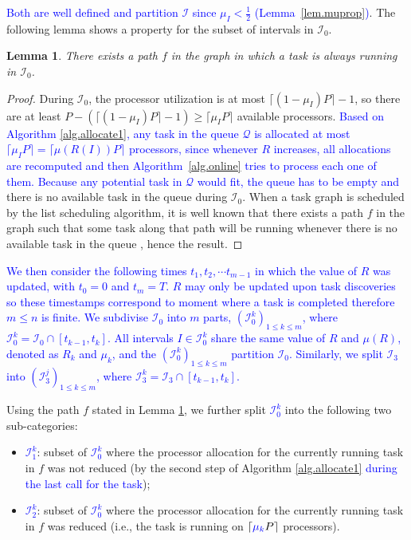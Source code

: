 \documentclass{article}
\newtheorem{lemma}{Lemma}
\newcommand\ratio{R\xspace}
\newcommand{\new}[1]{\textcolor{blue}{#1}}
\begin{document}
\new{Both are well defined and partition $\mathcal{I}$ since $\mu_I < \frac{1}{2}$ (Lemma~\ref{lem.muprop})}. The following lemma shows a property for the subset of intervals in $\mathcal{I}_0$.
\begin{lemma}\label{lem.I0_path}
There exists a path $f$ in the graph in which a task is always running in $\mathcal{I}_0$.
\end{lemma}

\begin{proof}
During $\mathcal{I}_0$, the processor utilization is at most $\lceil (1-\mu_I) P \rceil - 1$, so there are at least $P - (\lceil (1-\mu_I) P \rceil - 1) \ge \lceil \mu_I P \rceil$ available processors. \new{Based on Algorithm \ref{alg.allocate1}, any task in the queue $\mathcal{Q}$ is allocated at most $\lceil \mu_I P \rceil=\lceil \mu(\ratio(I)) P \rceil$ processors, since whenever $\ratio$ increases, all allocations are recomputed and then Algorithm~\ref{alg.online} tries to process each one of them. Because any potential task in $\mathcal{Q}$ would fit, the queue has to be empty and} there is no available task in the queue  during $\mathcal{I}_0$. When a task graph is scheduled by the list scheduling algorithm, it is well known that there exists a path $f$ in the graph such that some task along that path will be running whenever there is no available task in the queue \cite{Feldmann98_DAG, Lepere01_DAG, Jansen06_DAG}, hence the result.
\end{proof}

\new{We then consider the following times $t_1, t_2, \cdots t_{m-1}$ in which the value of $\ratio$ was updated, with $t_0=0$ and $t_m=T$. $\ratio$ may only be updated upon task discoveries so these timestamps correspond to moment where a task is completed therefore $m \leq n$ is finite. We subdivise $\mathcal{I}_0$ into $m$ parts, $(\mathcal{I}_0^k)_{1 \leq k \leq m}$, where $\mathcal{I}_0^k=\mathcal{I}_0 \cap [t_{k-1},t_k]$. All intervals $I \in \mathcal{I}_0^k$ share the same value of $\ratio$ and $\mu(\ratio)$, denoted as $\ratio_k$ and $\mu_k$, and the $(\mathcal{I}_0^k)_{1 \leq k \leq m}$ partition $\mathcal{I}_0$. Similarly, we split $\mathcal{I}_3$ into $(\mathcal{I}_3^j)_{1 \leq k \leq m}$, where $\mathcal{I}_3^k=\mathcal{I}_3 \cap [t_{k-1},t_k]$.
}

Using the path $f$ stated in Lemma \ref{lem.I0_path}, we further split \new{$\mathcal{I}_0^k$} into the following two sub-categories:
\begin{itemize}
\item \new{$\mathcal{I}_1^k$}: subset of \new{$\mathcal{I}_0^k$} where the processor allocation for the currently running task in $f$ was not reduced (by the second step of Algorithm \ref{alg.allocate1} \new{during the last call for the task});
\item \new{$\mathcal{I}_2^k$}:  subset of \new{$\mathcal{I}_0^k$} where the processor allocation for the currently running task in $f$ was reduced (i.e., the task is running on $\lceil \new{\mu_k} P \rceil$ processors).
\end{itemize}
\end{document}
